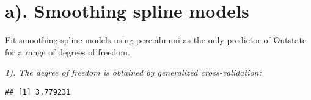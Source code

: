 \documentclass[
]{article}
\newenvironment{Shaded}{\begin{snugshade}}{\end{snugshade}}
\newcommand{\CommentTok}[1]{\textcolor[rgb]{0.56,0.35,0.01}{\textit{#1}}}
\newcommand{\DecValTok}[1]{\textcolor[rgb]{0.00,0.00,0.81}{#1}}
\newcommand{\FunctionTok}[1]{\textcolor[rgb]{0.00,0.00,0.00}{#1}}
\newcommand{\NormalTok}[1]{#1}
\newcommand{\OtherTok}[1]{\textcolor[rgb]{0.56,0.35,0.01}{#1}}
\newcommand{\SpecialCharTok}[1]{\textcolor[rgb]{0.00,0.00,0.00}{#1}}
\begin{document}
\hypertarget{a.-smoothing-spline-models}{%
\section{a). Smoothing spline models}\label{a.-smoothing-spline-models}}

Fit smoothing spline models using perc.alumni as the only predictor of
Outstate for a range of degrees of freedom.

\emph{1). The degree of freedom is obtained by generalized
cross-validation:}

\begin{Shaded}
\end{Shaded}

\begin{verbatim}
## [1] 3.779231
\end{verbatim}
\end{document}
